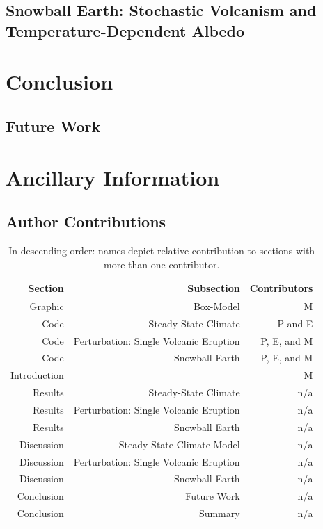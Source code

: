 \documentclass[12pt]{article}
\begin{document}
\subsection{Snowball Earth: Stochastic Volcanism and Temperature-Dependent Albedo}
\label{sec:snowballearth}

\section{Conclusion}
\subsection{Future Work}

\section{Ancillary Information}
\subsection{Author Contributions}

\begin{table}[H]
    \centering
    \begin{tabular}{rrr}
    Section & Subsection & Contributors \\
    \hline
    Graphic & Box-Model & M  \\
    Code & Steady-State Climate & P and E \\
    Code & Perturbation: Single Volcanic Eruption & P, E, and M \\
    Code & Snowball Earth & P, E, and M \\
    Introduction &  & M \\
    Results & Steady-State Climate & n/a \\
    Results & Perturbation: Single Volcanic Eruption & n/a \\
    Results & Snowball Earth & n/a\\
    Discussion & Steady-State Climate Model & n/a \\
    Discussion & Perturbation: Single Volcanic Eruption & n/a \\
    Discussion & Snowball Earth & n/a\\
    Conclusion & Future Work & n/a \\
    Conclusion & Summary & n/a \\
    \end{tabular}
    \caption{
        In descending order: names depict relative contribution to
        sections with more than one contributor.
    }
    \label{tab:contributions}
\end{table}
\end{document}
